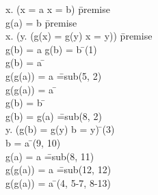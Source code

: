 \documentclass{article}
\begin{document}
\begin{proofbox}
\: \forall x. (x = a \lor x = b) \= \hbox{premise} \\
\: g(a) = b \= \hbox{premise} \\
\: \forall x. (\forall y. (g(x) = g(y) \rightarrow x = y)) \= \hbox{premise} \\
\: g(b) = a \lor g(b) = b \= \forallelim(1) \\
\openAlt
\: g(b) = a \= \asm \\
\: g(g(a)) = a \= =\hbox{sub}(5, 2) \\
\: g(g(a)) = a \=  \\
\splitAlt
\: g(b) = b \= \asm \\
\: g(b) = g(a) \= =\hbox{sub}(8, 2) \\
\: \forall y. (g(b) = g(y) \rightarrow b = y) \= \forallelim(3) \\
\: b = a \= \forallelim(9, 10) \\
\: g(a) = a \= =\hbox{sub}(8, 11) \\
\: g(g(a)) = a \= =\hbox{sub}(12, 12) \\
\closeAlt
\: g(g(a)) = a \= \orelim(4, 5-7, 8-13) \\
\end{proofbox}
\end{document}
